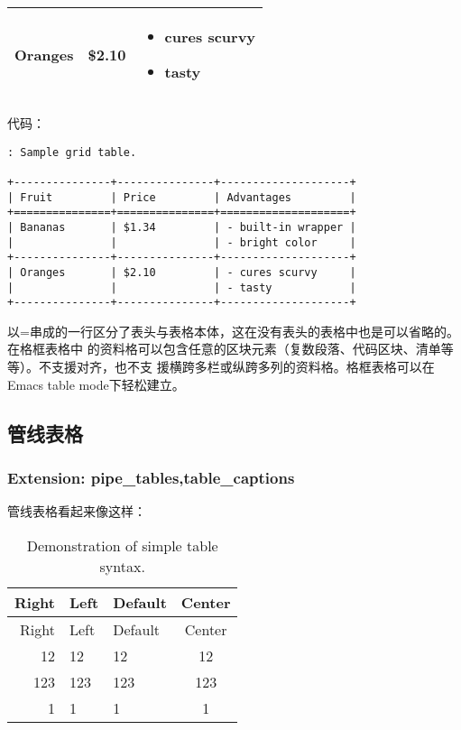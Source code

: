 \documentclass[fancyhdr,bookmark]{ctexbook}
\providecommand{\tightlist}{%
  \setlength{\itemsep}{0pt}\setlength{\parskip}{0pt}}
\begin{document}
\begin{longtable}[]{@{}lll@{}}
\begin{minipage}[t]{0.32\columnwidth}
Oranges\strut
\end{minipage} & \begin{minipage}[t]{0.32\columnwidth}\raggedright\strut
\$2.10\strut
\end{minipage} & \begin{minipage}[t]{0.32\columnwidth}\raggedright\strut
\begin{itemize}
\tightlist
\item
  cures scurvy
\item
  tasty
\end{itemize}\strut
\end{minipage}\tabularnewline
\bottomrule
\end{longtable}

代码：

\begin{lstlisting}
: Sample grid table.

+---------------+---------------+--------------------+
| Fruit         | Price         | Advantages         |
+===============+===============+====================+
| Bananas       | $1.34         | - built-in wrapper |
|               |               | - bright color     |
+---------------+---------------+--------------------+
| Oranges       | $2.10         | - cures scurvy     |
|               |               | - tasty            |
+---------------+---------------+--------------------+
\end{lstlisting}

以=串成的一行区分了表头与表格本体，这在没有表头的表格中也是可以省略的。在格框表格中
的资料格可以包含任意的区块元素（复数段落、代码区块、清单等等）。不支援对齐，也不支
援横跨多栏或纵跨多列的资料格。格框表格可以在Emacs table mode下轻松建立。

\subsection{管线表格}\label{ux7ba1ux7ebfux8868ux683c}

\subsubsection{Extension:
pipe\_tables,table\_captions}\label{extension-pipe_tablestable_captions}

管线表格看起来像这样：

\begin{longtable}[]{@{}rllc@{}}
\caption{Demonstration of simple table syntax.}\tabularnewline
\toprule
Right & Left & Default & Center\tabularnewline
\midrule
\endfirsthead
\toprule
Right & Left & Default & Center\tabularnewline
\midrule
\endhead
12 & 12 & 12 & 12\tabularnewline
123 & 123 & 123 & 123\tabularnewline
1 & 1 & 1 & 1\tabularnewline
\bottomrule
\end{longtable}
\end{document}
